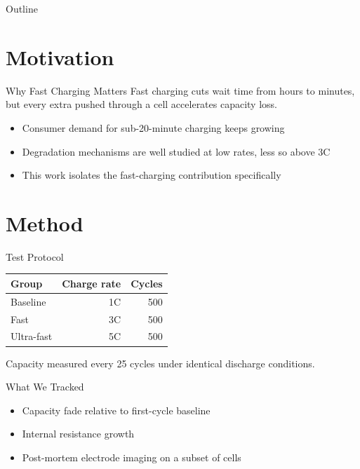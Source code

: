 \documentclass[8pt]{beamer}
\begin{document}
\makeboxedcover

\begin{frame}{Outline}
  \tableofcontents
\end{frame}

\section{Motivation}

\makesection

\begin{frame}{Why Fast Charging Matters}
  Fast charging cuts wait time from hours to minutes, but every extra
   pushed through a cell accelerates capacity loss.

  \begin{itemize}
    \item Consumer demand for sub-20-minute charging keeps growing
    \item Degradation mechanisms are well studied at low rates, less so above 3C
    \item This work isolates the fast-charging contribution specifically
  \end{itemize}
\end{frame}

\section{Method}

\makesection

\begin{frame}{Test Protocol}
  \begin{table}
    \small
    \centering
    \begin{tabular}{lrr}
      \toprule
      Group & Charge rate & Cycles \\
      \midrule
      Baseline & 1C & 500 \\
      Fast & 3C & 500 \\
      Ultra-fast & 5C & 500 \\
      \bottomrule
    \end{tabular}
  \end{table}
  Capacity measured every 25 cycles under identical discharge conditions.
\end{frame}

\begin{frame}{What We Tracked}
  \begin{itemize}
    \item Capacity fade relative to first-cycle baseline
    \item Internal resistance growth
    \item Post-mortem electrode imaging on a subset of cells
  \end{itemize}
\end{frame}
\end{document}
